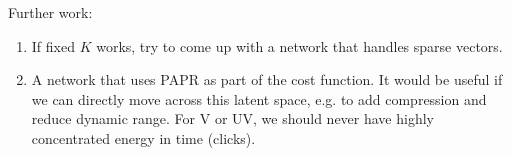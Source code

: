 \documentclass{article}
\begin{document}
Further work:
\begin{enumerate}
\item If fixed $K$ works, try to come up with a network that handles sparse vectors.
\item A network that uses PAPR as part of the cost function.  It would be useful if we can directly move across this latent space, e.g. to add compression and reduce dynamic range.  For V or UV, we should never have highly concentrated energy in time (clicks).
\end{enumerate}



\end{document}
